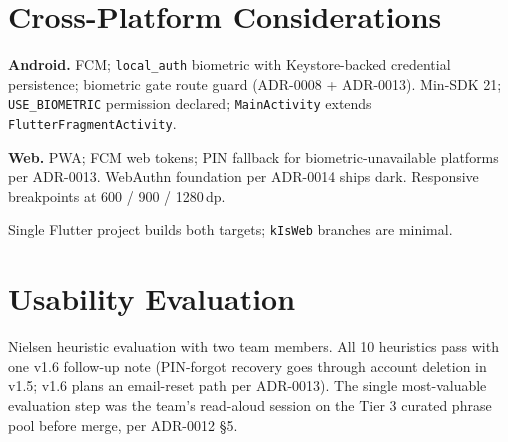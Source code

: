 \documentclass[11pt,a4paper]{article}
\begin{document}
\section{Cross-Platform Considerations}

\textbf{Android.} FCM; \texttt{local\_auth} biometric with
Keystore-backed credential persistence; biometric gate route guard
(ADR-0008 + ADR-0013). Min-SDK 21; \texttt{USE\_BIOMETRIC} permission
declared; \texttt{MainActivity} extends \texttt{FlutterFragmentActivity}.

\textbf{Web.} PWA; FCM web tokens; PIN fallback for biometric-unavailable
platforms per ADR-0013. WebAuthn foundation per ADR-0014 ships dark.
Responsive breakpoints at 600 / 900 / 1280\,dp.

Single Flutter project builds both targets; \texttt{kIsWeb} branches are
minimal.

\section{Usability Evaluation}

Nielsen heuristic evaluation with two team members. All 10 heuristics
pass with one v1.6 follow-up note (PIN-forgot recovery goes through
account deletion in v1.5; v1.6 plans an email-reset path per ADR-0013).
The single most-valuable evaluation step was the team's read-aloud
session on the Tier 3 curated phrase pool before merge, per ADR-0012
§5.

\printbibliography
\end{document}

